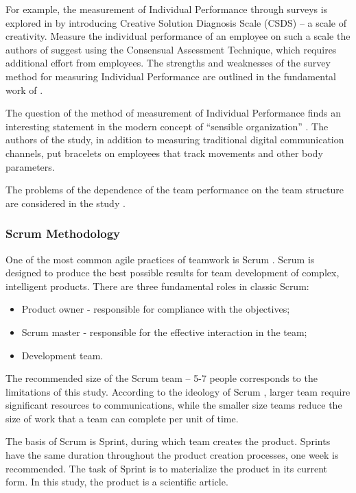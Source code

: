 \documentclass[12pt]{report}
\theoremstyle{definition}
\providecommand{\tightlist}{%
	\setlength{\itemsep}{0pt}\setlength{\parskip}{0pt}}
\begin{document}
For example, the measurement of Individual Performance through surveys is explored in \cite{cropley2012measuring} by introducing Creative Solution Diagnosis Scale (CSDS) -- a scale of creativity. 
Measure the individual performance of an employee on such a scale the authors of \cite{cropley2012measuring} suggest using the Consensual Assessment Technique, which requires additional effort from employees.
The strengths and weaknesses of the survey method for measuring Individual Performance are outlined in the fundamental work of \cite{jackson1965person}.

The question of the method of measurement of Individual Performance finds an interesting statement in the modern concept of ``sensible organization'' \cite{olguin2008sensible}.
The authors of the \cite{olguin2008sensible} study, in addition to measuring traditional digital communication channels, put bracelets on employees that track movements and other body parameters.

The problems of the dependence of the team performance on the team structure are considered in the study \cite{kradoya2016structure}.

\subsubsection{Scrum Methodology}
One of the most common agile practices of teamwork is Scrum \cite{sutherland2013scrum}. 
Scrum is designed to produce the best possible results for team development of complex, intelligent products.
There are three fundamental roles in classic Scrum:

\begin{itemize}
	\tightlist
	\item Product owner - responsible for compliance with the objectives;
	\item Scrum master - responsible for the effective interaction in the team;
	\item Development team.
\end{itemize}

The recommended size of the Scrum team -- 5-7 people corresponds to the limitations of this study.
According to the ideology of Scrum \cite{sutherland2013scrum}, larger team require significant resources to communications, while the smaller size teams reduce the size of work that a team can complete per unit of time.

The basis of Scrum is Sprint, during which team creates the product. 
Sprints have the same duration throughout the product creation processes, one week is recommended. 
The task of Sprint is to materialize the product in its current form. 
In this study, the product is a scientific article.
\end{document}
